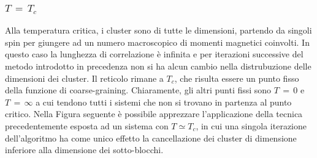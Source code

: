 \subsubsection{$T\,=\,T_c$}

Alla temperatura critica, i cluster sono di tutte le dimensioni, partendo da singoli spin per giungere ad un numero macroscopico di 
momenti magnetici coinvolti. In questo caso la lunghezza di correlazione è infinita e per iterazioni successive del metodo introdotto 
in precedenza non si ha alcun cambio nella distrubuzione delle dimensioni dei cluster. Il reticolo rimane a $T_c$, che risulta essere 
un punto fisso della funzione di coarse-graining. Chiaramente, gli altri punti fissi sono $T\,=\,0$ e $T\,=\,\infty$ a cui tendono 
tutti i sistemi che non si trovano in partenza al punto critico. Nella Figura seguente è possibile apprezzare l'applicazione della 
tecnica precedentemente esposta ad un sistema con $T \simeq T_c$, in cui una singola iterazione dell'algoritmo ha come unico effetto 
la cancellazione dei cluster di dimensione inferiore alla dimensione dei sotto-blocchi.


\vspace*{\fill}


